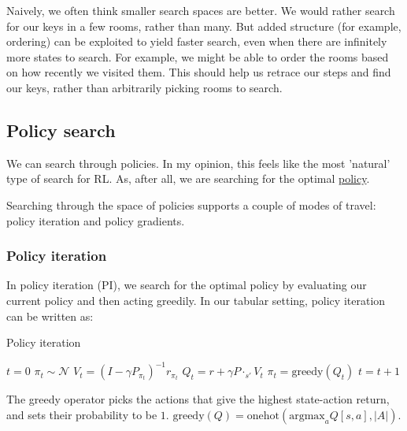 Naively, we often think smaller search spaces are better. We would rather
search for our keys in a few rooms, rather than many. But added
structure (for example, ordering) can be exploited to yield faster
search, even when there are infinitely more states to search. For example,
we might be able to order the rooms based on how recently we visited them.
This should help us retrace our steps and find our keys, rather than arbitrarily
picking rooms to search.

\subsection{Policy search}

We can search through policies. In my opinion, this feels like the most 'natural' type of search for RL.
As, after all, we are searching for the optimal \underline{policy}.

Searching through the space of policies supports a couple of modes of travel:
policy iteration and policy gradients.

\subsubsection{Policy iteration}

In policy iteration (PI), we search for the optimal policy by evaluating our current
policy and then acting greedily. In our tabular setting, policy iteration can be written as:

\begin{algorithm}
\caption{Policy iteration}
\begin{algorithmic}[1]

    \State $t=0$
    \State $\pi_t \sim \mathcal N$  
      \State $V_t = (I-\gamma P_{\pi_t})^{-1} r_{\pi_t}$ 
      \State $Q_t =  r + \gamma P\cdot_{s'} V_t$ 
      \State $\pi_t = \text{greedy}(Q_t) $ 
      \State $t = t + 1$
    \EndWhile
    \State {}
\EndProcedure

\end{algorithmic}
\end{algorithm}

The greedy operator picks the actions that give the highest state-action return,
and sets their probability to be $1$.
$\text{greedy}(Q) = \text{onehot}(\text{argmax}_a Q[s, a], |A|)$.

